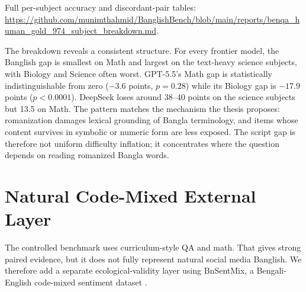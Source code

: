\begin{table}[H]
\centering
\caption{BEnQA human-gold 974 extension: reviewed Banglish minus Bangla gap in points by macro subject. Stars mark within-subject McNemar exact $p<0.05$.}
\label{tab:ext-subjects}
\small
{}

\smallskip
{\footnotesize Full per-subject accuracy and discordant-pair tables: \url{https://github.com/munimthahmid/BanglishBench/blob/main/reports/benqa_human_gold_974_subject_breakdown.md}.}
\end{table}

The breakdown reveals a consistent structure. For every frontier model, the Banglish gap is smallest on Math and largest on the text-heavy science subjects, with Biology and Science often worst. GPT-5.5's Math gap is statistically indistinguishable from zero ($-3.6$ points, $p = 0.28$) while its Biology gap is $-17.9$ points ($p < 0.0001$). DeepSeek loses around 38--40 points on the science subjects but 13.5 on Math. The pattern matches the mechanism the thesis proposes: romanization damages lexical grounding of Bangla terminology, and items whose content survives in symbolic or numeric form are less exposed. The script gap is therefore not uniform difficulty inflation; it concentrates where the question depends on reading romanized Bangla words.

\section{Natural Code-Mixed External Layer}

The controlled benchmark uses curriculum-style QA and math. That gives strong paired evidence, but it does not fully represent natural social media Banglish. We therefore add a separate ecological-validity layer using BnSentMix, a Bengali-English code-mixed sentiment dataset \cite{bnsentmix2024}.

